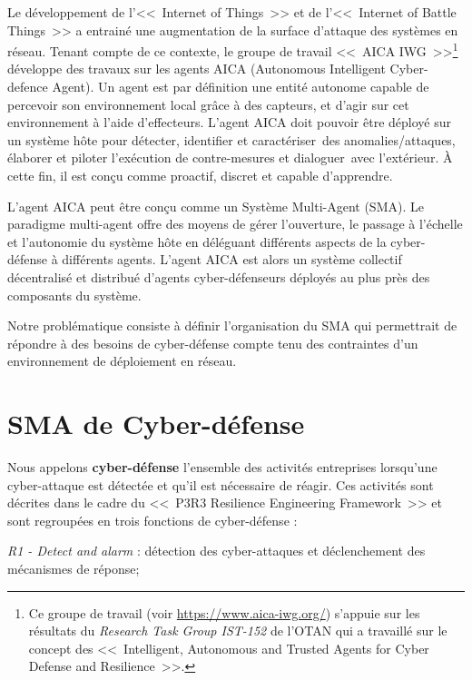 \documentclass[french]{pfia}
\begin{document}
Le développement de l'<<~Internet of Things~>> et de l'<<~Internet of Battle Things~>>  a entrainé une augmentation de la surface d'attaque des systèmes en réseau.
Tenant compte de ce contexte, le groupe de travail <<~AICA IWG~>>\footnote{Ce groupe de travail (voir \url{https://www.aica-iwg.org/}) s'appuie sur les résultats du \textit{Research Task Group IST-152} de l'OTAN qui a travaillé sur le concept des <<~Intelligent, Autonomous and Trusted Agents for Cyber Defense and Resilience~>>.} développe des travaux sur les agents AICA (Autonomous Intelligent Cyber-defence Agent).
Un agent est par définition une entité autonome capable de percevoir son environnement local grâce à des capteurs, et d’agir sur cet environnement à l'aide d'effecteurs\cite{russell1995modern}.
L'agent AICA doit pouvoir être déployé sur un système hôte pour détecter, identifier et caractériser des anomalies/attaques, élaborer et piloter l’exécution de contre-mesures et dialoguer avec l'extérieur. À cette fin, il est conçu comme proactif, discret et capable d’apprendre.


L'agent AICA peut être conçu comme un Système Multi-Agent (SMA). Le paradigme multi-agent offre des moyens de gérer l'ouverture, le passage à l'échelle et l'autonomie du système hôte en déléguant différents aspects de la cyber-défense à différents agents. L'agent AICA  est alors un système collectif décentralisé et distribué d'agents cyber-défenseurs déployés au plus près des composants du système\cite{ieeesp_KottT20}.

Notre problématique consiste à définir l'organisation du SMA qui permettrait de répondre à des besoins de cyber-défense compte tenu des contraintes d'un environnement de déploiement en réseau.


\section{SMA de Cyber-défense}

Nous appelons \textbf{cyber-défense} l'ensemble des activités entreprises lorsqu'une cyber-attaque est détectée et qu'il est nécessaire de réagir\cite{theron_autonomous_2021}. Ces activités sont décrites dans le cadre du <<~P3R3 Resilience Engineering Framework~>>\cite{theron_p3r3_2021} et sont regroupées en trois fonctions de cyber-défense :

\textit{R1 - Detect and alarm} : détection des cyber-attaques  et déclenchement des mécanismes de réponse;
\end{document}
